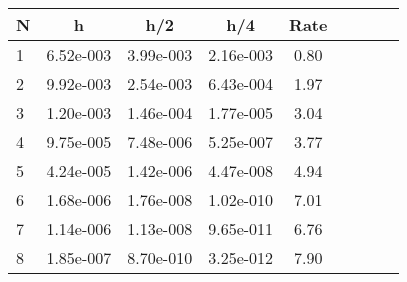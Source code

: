 \begin{tabular}{lcccccccc}
N & h & h/2 & h/4 & Rate\\
\hline
1& 6.52e-003& 3.99e-003& 2.16e-003& 0.80\\
2& 9.92e-003& 2.54e-003& 6.43e-004& 1.97\\
3& 1.20e-003& 1.46e-004& 1.77e-005& 3.04\\
4& 9.75e-005& 7.48e-006& 5.25e-007& 3.77\\
5& 4.24e-005& 1.42e-006& 4.47e-008& 4.94\\
6& 1.68e-006& 1.76e-008& 1.02e-010& 7.01\\
7& 1.14e-006& 1.13e-008& 9.65e-011& 6.76\\
8& 1.85e-007& 8.70e-010& 3.25e-012& 7.90\\
\hline
\end{tabular}
